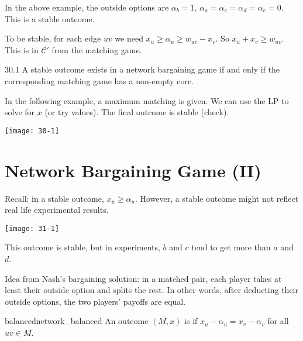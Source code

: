 \documentclass[12pt,letterpaper]{report}
\begin{document}
\begin{ex}
  In the above example, the outside options are $\alpha_b = 1$,
  $\alpha_a = \alpha_c = \alpha_d = \alpha_e = 0$.
  This is a stable outcome.
\end{ex}

To be stable, for each edge $uv$ we need $x_u \geq \alpha_u \geq w_{uv} - x_v$.
So $x_u + x_v \geq w_{uv}$.
This is in $\mathcal{C}'$ from the matching game.

\begin{prop}{}{30.1}
  A stable outcome exists in a network bargaining game if and only if the corresponding matching
  game has a non-empty core.
\end{prop}

\begin{ex}
  In the following example, a maximum matching is given.
  We can use the LP to solve for $x$ (or try values).
  The final outcome is stable (check).

  \begin{center}
    \texttt{[image: 30-1]}
  \end{center}
\end{ex}

\section{Network Bargaining Game (II)}

Recall: in a stable outcome, $x_u \geq \alpha_u$.
However, a stable outcome might not reflect real life experimental results.

\begin{ex}
  \begin{center}
    \texttt{[image: 31-1]}
  \end{center}

  This outcome is stable, but in experiments, $b$ and $c$ tend to get more than $a$ and $d$.
\end{ex}

Idea from Nash's bargaining solution: in a matched pair, each player takes at least their outside
option and splits the rest.
In other words, after deducting their outside options, the two players' payoffs are equal.

\begin{defn}{balanced}{network_balanced}
  An outcome $(M, x)$ is  if $x_u - \alpha_u = x_v - \alpha_v$ for all $uv \in M$.
\end{defn}
\end{document}
